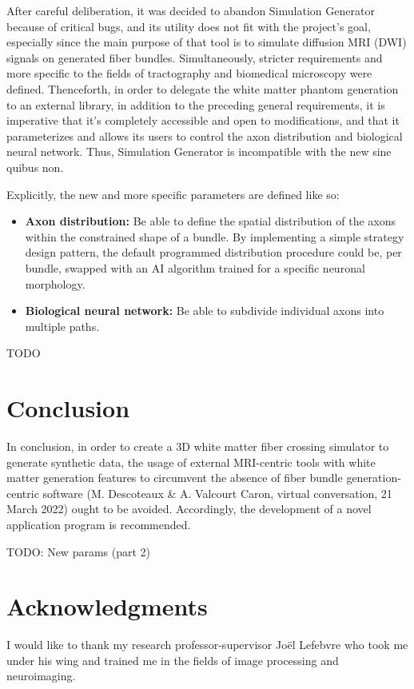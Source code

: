 \documentclass{article}
\begin{document}
  After careful deliberation, it was decided to abandon Simulation Generator because of critical bugs, and its utility does not fit with the project's goal, especially since the main purpose of that tool is to simulate diffusion MRI (DWI) signals on generated fiber bundles.
  Simultaneously, stricter requirements and more specific to the fields of tractography and biomedical microscopy were defined.
  Thenceforth, in order to delegate the white matter phantom generation to an external library, in addition to the preceding general requirements, it is imperative that it's completely accessible and open to modifications, and that it parameterizes and allows its users to control the axon distribution and biological neural network.
  Thus, Simulation Generator is incompatible with the new sine quibus non.

  Explicitly, the new and more specific parameters are defined like so:
  \begin{itemize}
    \item \textbf{Axon distribution:} Be able to define the spatial distribution of the axons within the constrained shape of a bundle.
    By implementing a simple strategy design pattern, the default programmed distribution procedure could be, per bundle, swapped with an AI algorithm trained for a specific neuronal morphology.
    \item \textbf{Biological neural network:} Be able to subdivide individual axons into multiple paths.
  \end{itemize}

  TODO


  \section{Conclusion}\label{sec:conclusion}

  In conclusion, in order to create a 3D white matter fiber crossing simulator to generate synthetic data, the usage of external MRI-centric tools with white matter generation features to circumvent the absence of fiber bundle generation-centric software (M. Descoteaux \& A. Valcourt Caron, virtual conversation, 21 March 2022) ought to be avoided.
  Accordingly, the development of a novel application program is recommended.

  TODO: New params (part 2)

  \section*{Acknowledgments}\label{sec:thanks}

  I would like to thank my research professor-supervisor Joël Lefebvre who took me under his wing and trained me in the fields of image processing and neuroimaging.


  
  
\end{document}
